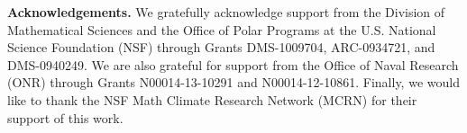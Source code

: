 \documentclass[11pt]{amsart}
\begin{document}
\medskip

{\bf Acknowledgements.}
We gratefully acknowledge support from the Division of Mathematical
Sciences and the Office of Polar Programs at the U.S. 
National Science Foundation (NSF) through Grants
DMS-1009704, ARC-0934721, and DMS-0940249. We are also grateful for 
support from the Office of Naval Research (ONR) through
Grants N00014-13-10291 and N00014-12-10861. Finally, we would like to 
thank the NSF Math Climate Research Network (MCRN) for their support
of this work. 


\medskip



\end{document}
